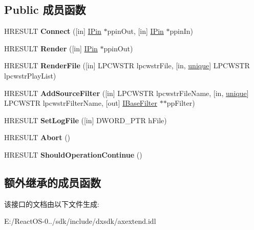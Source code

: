 \subsection*{Public 成员函数}
\begin{DoxyCompactItemize}
\item 
\mbox{\label{interface_i_graph_builder_a5dc3fb77071c3f9a0d210998305a4e28}} 
H\+R\+E\+S\+U\+LT {\bfseries Connect} (\mbox{[}in\mbox{]} \hyperlink{interface_i_pin}{I\+Pin} $\ast$ppin\+Out, \mbox{[}in\mbox{]} \hyperlink{interface_i_pin}{I\+Pin} $\ast$ppin\+In)
\item 
\mbox{\label{interface_i_graph_builder_a39360666a931671b48b7e4beddb4393c}} 
H\+R\+E\+S\+U\+LT {\bfseries Render} (\mbox{[}in\mbox{]} \hyperlink{interface_i_pin}{I\+Pin} $\ast$ppin\+Out)
\item 
\mbox{\label{interface_i_graph_builder_a559404c3e1aba1ce56bedf0f10562e33}} 
H\+R\+E\+S\+U\+LT {\bfseries Render\+File} (\mbox{[}in\mbox{]} L\+P\+C\+W\+S\+TR lpcwstr\+File, \mbox{[}in, \hyperlink{interfaceunique}{unique}\mbox{]} L\+P\+C\+W\+S\+TR lpcwstr\+Play\+List)
\item 
\mbox{\label{interface_i_graph_builder_afef5207560b1586241f27887837b3312}} 
H\+R\+E\+S\+U\+LT {\bfseries Add\+Source\+Filter} (\mbox{[}in\mbox{]} L\+P\+C\+W\+S\+TR lpcwstr\+File\+Name, \mbox{[}in, \hyperlink{interfaceunique}{unique}\mbox{]} L\+P\+C\+W\+S\+TR lpcwstr\+Filter\+Name, \mbox{[}out\mbox{]} \hyperlink{interface_i_base_filter}{I\+Base\+Filter} $\ast$$\ast$pp\+Filter)
\item 
\mbox{\label{interface_i_graph_builder_a04b4d65b5252275c6bde75f481773e7f}} 
H\+R\+E\+S\+U\+LT {\bfseries Set\+Log\+File} (\mbox{[}in\mbox{]} D\+W\+O\+R\+D\+\_\+\+P\+TR h\+File)
\item 
\mbox{\label{interface_i_graph_builder_a2a51ae0a84b736a2c63a5cad3b97f657}} 
H\+R\+E\+S\+U\+LT {\bfseries Abort} ()
\item 
\mbox{\label{interface_i_graph_builder_ab586fb5477007dc37ee1c27e274228f9}} 
H\+R\+E\+S\+U\+LT {\bfseries Should\+Operation\+Continue} ()
\end{DoxyCompactItemize}
\subsection*{额外继承的成员函数}


该接口的文档由以下文件生成\+:\begin{DoxyCompactItemize}
\item 
E\+:/\+React\+O\+S-\/0../sdk/include/dxsdk/axextend.\+idl\end{DoxyCompactItemize}
